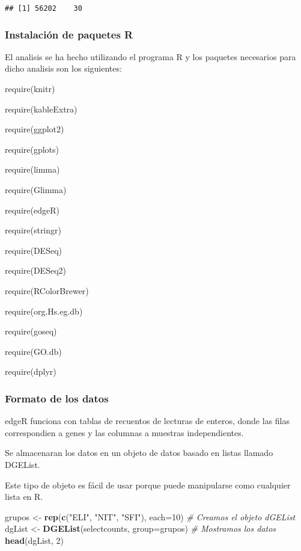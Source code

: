 \documentclass[
]{article}
\newenvironment{Shaded}{\begin{snugshade}}{\end{snugshade}}
\newcommand{\CommentTok}[1]{\textcolor[rgb]{0.56,0.35,0.01}{\textit{#1}}}
\newcommand{\DataTypeTok}[1]{\textcolor[rgb]{0.13,0.29,0.53}{#1}}
\newcommand{\DecValTok}[1]{\textcolor[rgb]{0.00,0.00,0.81}{#1}}
\newcommand{\KeywordTok}[1]{\textcolor[rgb]{0.13,0.29,0.53}{\textbf{#1}}}
\newcommand{\NormalTok}[1]{#1}
\newcommand{\StringTok}[1]{\textcolor[rgb]{0.31,0.60,0.02}{#1}}
\begin{document}
\begin{verbatim}
## [1] 56202    30
\end{verbatim}

\hypertarget{instalaciuxf3n-de-paquetes-r}{%
\subsubsection{Instalación de paquetes
R}\label{instalaciuxf3n-de-paquetes-r}}

El analisis se ha hecho utilizando el programa R y los paquetes
necesarios para dicho analisis son los siguientes:

require(knitr)

require(kableExtra)

require(ggplot2)

require(gplots)

require(limma)

require(Glimma)

require(edgeR)

require(stringr)

require(DESeq)

require(DESeq2)

require(RColorBrewer)

require(org.Hs.eg.db)

require(goseq)

require(GO.db)

require(dplyr)

\hypertarget{formato-de-los-datos}{%
\subsubsection{Formato de los datos}\label{formato-de-los-datos}}

edgeR funciona con tablas de recuentos de lecturas de enteros, donde las
filas correspondien a genes y las columnas a muestras independientes.

Se almacenaran los datos en un objeto de datos basado en listas llamado
DGEList.

Este tipo de objeto es fácil de usar porque puede manipularse como
cualquier lista en R.

\begin{Shaded}
\begin{Highlighting}[]
\NormalTok{grupos <-}\StringTok{ }\KeywordTok{rep}\NormalTok{(}\KeywordTok{c}\NormalTok{(}\StringTok{"ELI"}\NormalTok{, }\StringTok{"NIT"}\NormalTok{, }\StringTok{"SFI"}\NormalTok{), }\DataTypeTok{each=}\DecValTok{10}\NormalTok{)}
\CommentTok{# Creamos el objeto dGEList}
\NormalTok{dgList <-}\StringTok{ }\KeywordTok{DGEList}\NormalTok{(selectcounts, }\DataTypeTok{group=}\NormalTok{grupos)}
\CommentTok{# Mostramos los datos}
\KeywordTok{head}\NormalTok{(dgList, }\DecValTok{2}\NormalTok{)}
\end{Highlighting}
\end{Shaded}
\end{document}
